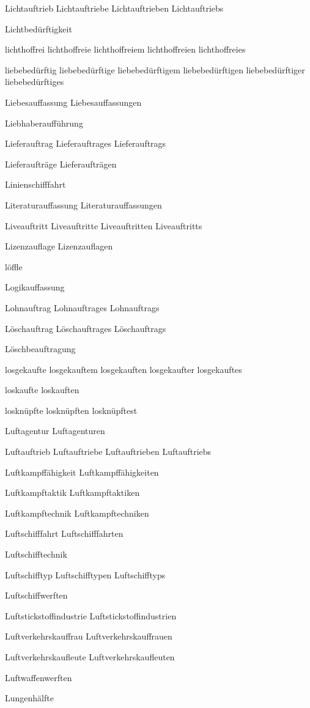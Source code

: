 Lichtauftrieb
Lichtauftriebe
Lichtauftrieben
Lichtauftriebs

Lichtbedürftigkeit

lichthoffrei
lichthoffreie
lichthoffreiem
lichthoffreien
lichthoffreies

liebebedürftig
liebebedürftige
liebebedürftigem
liebebedürftigen
liebebedürftiger
liebebedürftiges

Liebesauffassung
Liebesauffassungen

Liebhaberaufführung

Lieferauftrag
Lieferauftrages
Lieferauftrags

Lieferaufträge
Lieferaufträgen

Linienschifffahrt

Literaturauffassung
Literaturauffassungen

Liveauftritt
Liveauftritte
Liveauftritten
Liveauftritts

Lizenzauflage
Lizenzauflagen

löffle

Logikauffassung

Lohnauftrag
Lohnauftrages
Lohnauftrags

Löschauftrag
Löschauftrages
Löschauftrags

Löschbeauftragung

losgekaufte
losgekauftem
losgekauften
losgekaufter
losgekauftes

loskaufte
loskauften

losknüpfte
losknüpften
losknüpftest

Luftagentur
Luftagenturen

Luftauftrieb
Luftauftriebe
Luftauftrieben
Luftauftriebs

Luftkampffähigkeit
Luftkampffähigkeiten

Luftkampftaktik
Luftkampftaktiken

Luftkampftechnik
Luftkampftechniken

Luftschifffahrt
Luftschifffahrten

Luftschifftechnik

Luftschifftyp
Luftschifftypen
Luftschifftyps

Luftschiffwerften

Luftstickstoffindustrie
Luftstickstoffindustrien

Luftverkehrskauffrau
Luftverkehrskauffrauen

Luftverkehrskaufleute
Luftverkehrskaufleuten

Luftwaffenwerften

Lungenhälfte


